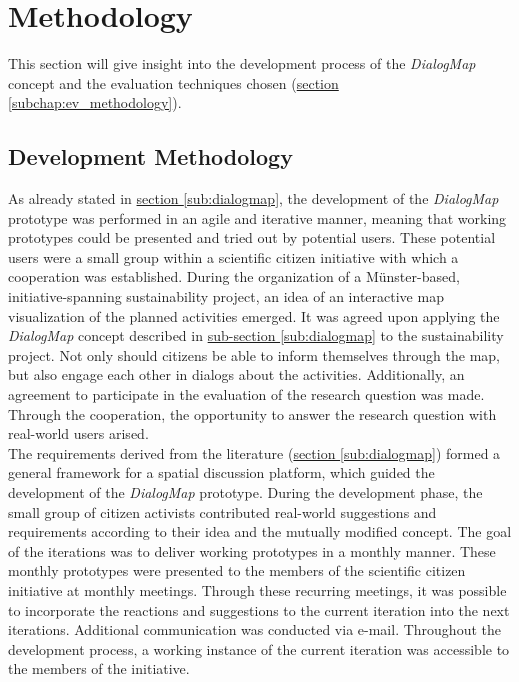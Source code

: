 \section{Methodology}
\label{chap:methodology}
This section will give insight into the development process of the \textit{DialogMap} concept and the evaluation techniques chosen (\hyperref[subchap:ev_methodology]{section \ref{subchap:ev_methodology}}).

\subsection{Development Methodology}
As already stated in \hyperref[sub:dialogmap]{section \ref{sub:dialogmap}}, the development of the \textit{DialogMap} prototype was performed in an agile and iterative manner, meaning that working prototypes could be presented and tried out by potential users. These potential users were a small group within a scientific citizen initiative with which a cooperation was established. During the organization of a Münster-based, initiative-spanning sustainability project, an idea of an interactive map visualization of the planned activities emerged. It was agreed upon applying the \textit{DialogMap} concept described in \hyperref[sub:dialogmap]{sub-section \ref{sub:dialogmap}} to the sustainability project. Not only should citizens be able to inform themselves through the map, but also engage each other in dialogs about the activities. Additionally, an agreement to participate in the evaluation of the research question was made. Through the cooperation, the opportunity to answer the research question with real-world users arised.\\
The requirements derived from the literature (\hyperref[sub:dialogmap]{section \ref{sub:dialogmap}}) formed a general framework for a spatial discussion platform, which guided the development of the \textit{DialogMap} prototype. During the development phase, the small group of citizen activists contributed real-world suggestions and requirements according to their idea and the mutually modified concept. The goal of the iterations was to deliver working prototypes in a monthly manner. These monthly prototypes were presented to the members of the scientific citizen initiative at monthly meetings. Through these recurring meetings, it was possible to incorporate the reactions and suggestions to the current iteration into the next iterations. Additional communication was conducted via e-mail. Throughout the development process, a working instance of the current iteration was accessible to the members of the initiative. %

